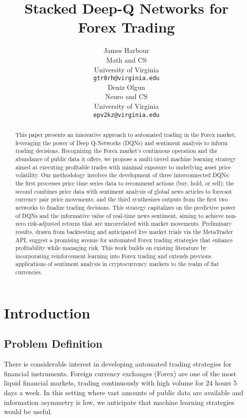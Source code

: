 \documentclass{article}
\title{Stacked Deep-Q Networks for Forex Trading}
\author{
  James Harbour \\
  Math and CS \\
  University of Virginia \\
  \texttt{gtr8rh@virginia.edu} \\
   \And
  Deniz Olgun \\
  Neuro and CS \\
  University of Virginia \\
  \texttt{epv2kz@virginia.edu} \\
}
\begin{document}
\maketitle

\begin{abstract}
This paper presents an innovative approach to automated trading in the Forex market, leveraging the power of Deep Q-Networks (DQNs) and sentiment analysis to inform trading decisions. Recognizing the Forex market's continuous operation and the abundance of public data it offers, we propose a multi-tiered machine learning strategy aimed at executing profitable trades with minimal exposure to underlying asset price volatility. Our methodology involves the development of three interconnected DQNs: the first processes price time series data to recommend actions (buy, hold, or sell); the second combines price data with sentiment analysis of global news articles to forecast currency pair price movements; and the third synthesizes outputs from the first two networks to finalize trading decisions. This strategy capitalizes on the predictive power of DQNs and the informative value of real-time news sentiment, aiming to achieve non-zero risk-adjusted returns that are uncorrelated with market movements. Preliminary results, drawn from backtesting and anticipated live market trials via the MetaTrader API, suggest a promising avenue for automated Forex trading strategies that enhance profitability while managing risk. This work builds on existing literature by incorporating reinforcement learning into Forex trading and extends previous applications of sentiment analysis in cryptocurrency markets to the realm of fiat currencies.
\end{abstract}




\section{Introduction}
\subsection{Problem Definition}

There is considerable interest in developing automated trading strategies for financial instruments. Foreign currency exchanges (Forex) are one of the most liquid financial markets, trading continuously with high volume for 24 hours 5 days a week. In this setting where vast amounts of public data are available and information asymmetry is low, we anticipate that machine learning strategies would be useful. 
\end{document}
